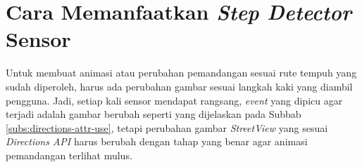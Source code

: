 
\section{Cara Memanfaatkan \textit{Step Detector} Sensor}
Untuk membuat animasi atau perubahan pemandangan sesuai rute tempuh yang sudah diperoleh, harus ada perubahan gambar sesuai langkah kaki yang diambil pengguna. Jadi, setiap kali sensor mendapat rangsang, \textit{event} yang dipicu agar terjadi adalah gambar berubah seperti yang dijelaskan pada Subbab \ref{subs:directions-attr-use}, tetapi perubahan gambar \textit{StreetView} yang sesuai \textit{Directions API} harus berubah dengan tahap yang benar agar animasi pemandangan terlihat mulus.